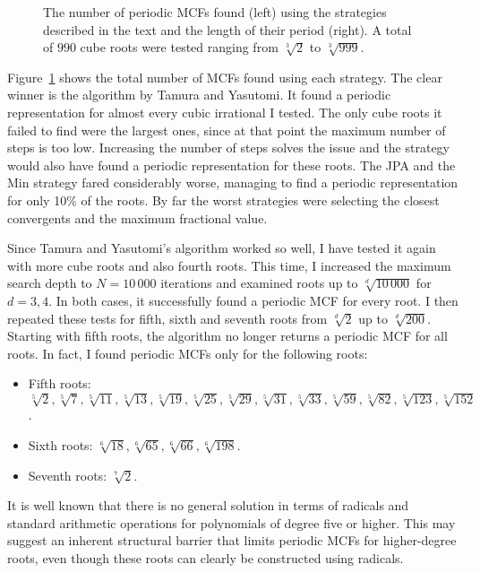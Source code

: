 \begin{figure}[tbp]
  \centering
  
  \caption{
    The number of periodic MCFs found (left) using the strategies described in the
    text and the length of their period (right).
    A total of $990$ cube roots were tested ranging from $\sqrt[3]{2}$ to $\sqrt[3]{999}$.
  }
  \label{fig:comparison}
\end{figure}

Figure~\ref{fig:comparison} shows the total number of MCFs found using each strategy.
The clear winner is the algorithm by Tamura and Yasutomi.
It found a periodic representation for almost every cubic irrational I tested.
The only cube roots it failed to find were the largest ones,
since at that point the maximum number of steps is too low.
Increasing the number of steps solves the issue and the strategy would also
have found a periodic representation for these roots.
The JPA and the Min strategy fared considerably worse,
managing to find a periodic representation for only 10\% of the roots.
By far the worst strategies were selecting the closest convergents and the
maximum fractional value.

Since Tamura and Yasutomi's algorithm worked so well,
I have tested it again with more cube roots and also fourth roots.
This time, I increased the maximum search depth to $N = 10\,000$ iterations
and examined roots up to $\sqrt[d]{10\,000}$ for $d=3,4$.
In both cases, it successfully found a periodic MCF for every root.
I then repeated these tests for fifth, sixth and seventh roots
from $\sqrt[d]{2}$ up to $\sqrt[d]{200}$.
Starting with fifth roots, the algorithm no longer returns a periodic MCF for all roots.
In fact, I found periodic MCFs only for the following roots:
\begin{itemize}
  \item Fifth roots:
    $\sqrt[5]{2}, \sqrt[5]{7}, \sqrt[5]{11}, \sqrt[5]{13}, \sqrt[5]{19},
    \sqrt[5]{25}, \sqrt[5]{29}, \sqrt[5]{31}, \sqrt[5]{33}, \sqrt[5]{59},
    \sqrt[5]{82}, \sqrt[5]{123}, \sqrt[5]{152}$.
  \item Sixth roots: $\sqrt[6]{18}, \sqrt[6]{65}, \sqrt[6]{66},\sqrt[6]{198}$.
  \item Seventh roots: $\sqrt[7]{2}$.
\end{itemize}
It is well known that there is no general solution in terms of radicals and
standard arithmetic operations for polynomials of degree five or higher.
This may suggest an inherent structural barrier that limits periodic MCFs for
higher-degree roots, even though these roots can clearly be constructed using
radicals.

